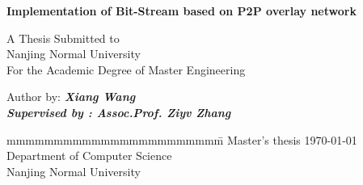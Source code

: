 \documentclass[a4paper,12pt]{book}
\begin{document}
\begin{titlepage}

\vspace{3cm}


\noindent
\setlength{\baselineskip}{2\baselineskip}
\begin{center}
{{\Large \bf Implementation of Bit-Stream based on P2P overlay network }}

\vspace{1cm}
A Thesis Submitted to \\
Nanjing Normal University\\
For the Academic Degree of Master Engineering \\
\end{center}


\newcommand{\TitleStyle}[1]{{\Large \textbf{#1}}}
\newcommand{\TitleSpace}{\vspace{2pt}}
\vspace{2cm}
\noindent
{Author by: \bfseries{\emph{Xiang Wang}}\\
\itshape{Supervised by} : Assoc.Prof. \bfseries{\emph{Ziyv Zhang}}}

\vspace{1cm}
\vspace{\fill}
\vspace{2cm}
\begin{tabbing}
mmmmmmmmmmmmmmmmmmmmmmm\= \kill
\>Master's thesis \today\\
\>Department of Computer Science\\
\>Nanjing Normal University\\
\> \\
\end{tabbing}
\end{titlepage}

\thispagestyle{empty}
\newlength{\origpar}
\setlength{\origpar}{\parindent}
\setlength{\parindent}{0pt}

\setlength{\parindent}{\origpar}

\thispagestyle{empty}
\tableofcontents
\clearpage
\pagebreak 
\renewcommand {\baselinestretch} {1.389}
\linespread{1.5}
%
%
\end{document}
